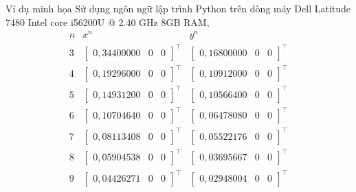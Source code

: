 \documentclass[aspectratio=169]{beamer}
\theoremstyle{plain}
\theoremstyle{definition}
\theoremstyle{remark}
\begin{document}
\begin{frame}{Ví dụ minh họa}
    Sử dụng ngôn ngữ lập trình Python trên dòng máy Dell Latitude 7480 Intel core i5\textendash 6200U @ 2.40 GHz 8GB RAM,
$$\begin{array}{ccc}
    n & x^{n} & y^{n} \\ \hline \hline 
    3 & \begin{bmatrix} 0,34400000 & 0 & 0 \end{bmatrix}^\top & \begin{bmatrix} 0,16800000 & 0 & 0 \end{bmatrix}^\top\\
    4 & \begin{bmatrix} 0,19296000 & 0 & 0 \end{bmatrix}^\top & \begin{bmatrix} 0,10912000 & 0 & 0 \end{bmatrix}^\top\\
    5 & \begin{bmatrix} 0,14931200 & 0 & 0 \end{bmatrix}^\top & \begin{bmatrix} 0,10566400 & 0 & 0 \end{bmatrix}^\top\\
    6 & \begin{bmatrix} 0,10704640 & 0 & 0 \end{bmatrix}^\top & \begin{bmatrix} 0,06478080 & 0 & 0 \end{bmatrix}^\top\\
    7 & \begin{bmatrix} 0,08113408 & 0 & 0 \end{bmatrix}^\top & \begin{bmatrix} 0,05522176 & 0 & 0 \end{bmatrix}^\top\\
    8 & \begin{bmatrix} 0,05904538 & 0 & 0 \end{bmatrix}^\top & \begin{bmatrix} 0,03695667 & 0 & 0 \end{bmatrix}^\top\\
    9 & \begin{bmatrix} 0,04426271 & 0 & 0 \end{bmatrix}^\top & \begin{bmatrix} 0,02948004 & 0 & 0 \end{bmatrix}^\top
\end{array}$$
\end{frame}
\end{document}
